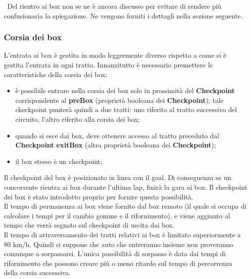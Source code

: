 \
Del rientro ai box non se ne \`{e} ancora discusso per evitare di rendere
pi\`{u} confusionaria la spiegazione. Ne vengono forniti i dettagli nella sezione seguente.
\subsubsection{Corsia dei box}
L'entrata ai box è gestita in modo leggermente diverso rispetto a come si è gestita l'entrata in ogni tratto.
Innanzitutto è necessario premettere le caratteristiche della corsia dei box:
\begin{itemize}
\item è possibile entrare nella corsia dei box solo in prossimità del \textbf{Checkpoint} corrispondente al \textbf{preBox} (proprietà booleana
dei \textbf{Checkpoint}); tale checkpoint punterà quindi a due tratti: uno riferito al tratto successivo del circuito, l'altro riferito
alla corsia dei box;
\item quando si esce dai box, deve ottenere accesso al tratto preceduto dal \textbf{Checkpoint} \textbf{exitBox} (altra proprietà booleana
dei \textbf{Checkpoint});
\item il box stesso è un checkpoint;
\end{itemize}
Il checkpoint del box è posizionato in linea con il goal. Di conseguenza se un concorrente rientra ai 
box durante l'ultima lap, finirà la gara ai box. Il checkpoint dei box è stato introdotto proprio per
fornire questa possibilità.\\
Il tempo di permanenza ai box viene fornito dal box remoto (il quale si occupa di calcolare
i tempi per il cambio gomme e il rifornimento), e viene aggiunto al tempo che verrà segnato sul checkpoint
di uscita dai box.\\
Il tempo di attraversamento dei tratti relativi ai box è limitato superiormente a 80 km/h. Quindi si suppone
che auto che entreranno insieme non proveranno comunque a sorpassarsi. L'unica possibilità di sorpasso è data
dai tempi di rifornimento che possono creare più o meno ritardo sul tempo di percorrenza della corsia successiva.\\
